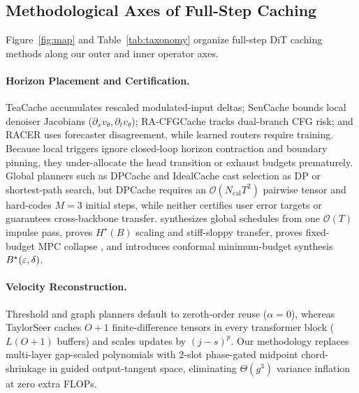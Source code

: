 \subsection{Methodological Axes of Full-Step Caching}
Figure~\ref{fig:map} and Table~\ref{tab:taxonomy} organize full-step DiT caching methods along our outer and inner operator axes.

\paragraph{Horizon Placement and Certification.}
TeaCache \citep{liu2025teacache} accumulates rescaled modulated-input deltas; SenCache \citep{haghighi2026sencache} bounds local denoiser Jacobians ($\partial_x v_\theta, \partial_t v_\theta$); RA-CFGCache \citep{liu2026racfgcache} tracks dual-branch CFG risk; and RACER \citep{li2026racer} uses forecaster disagreement, while learned routers \citep{ma2024learning} require training. Because local triggers ignore closed-loop horizon contraction and boundary pinning, they under-allocate the head transition or exhaust budgets prematurely. Global planners such as DPCache \citep{cui2026dpcache} and IdealCache \citep{xue2026idealcache} cast selection as DP or shortest-path search, but DPCache requires an $\mathcal{O}(N_{\mathrm{cal}} T^2)$ pairwise tensor and hard-codes $M=3$ initial steps, while neither certifies user error targets or guarantees cross-backbone transfer. \method{} synthesizes global schedules from one $\mathcal{O}(T)$ impulse pass, proves $H^\star(B)$ scaling and stiff-sloppy transfer, proves fixed-budget MPC collapse \citep{rawlings2017mpc}, and introduces conformal minimum-budget synthesis $B^\star(\varepsilon, \delta)$.

\paragraph{Velocity Reconstruction.}
Threshold and graph planners default to zeroth-order reuse ($\alpha=0$), whereas TaylorSeer \citep{liu2025taylorseer} caches $O{+}1$ finite-difference tensors in every transformer block ($L(O{+}1)$ buffers) and scales updates by $(j - s)^p$. Our methodology replaces multi-layer gap-scaled polynomials with 2-slot phase-gated midpoint chord-shrinkage in guided output-tangent space, eliminating $\Theta(g^3)$ variance inflation at zero extra FLOPs.
